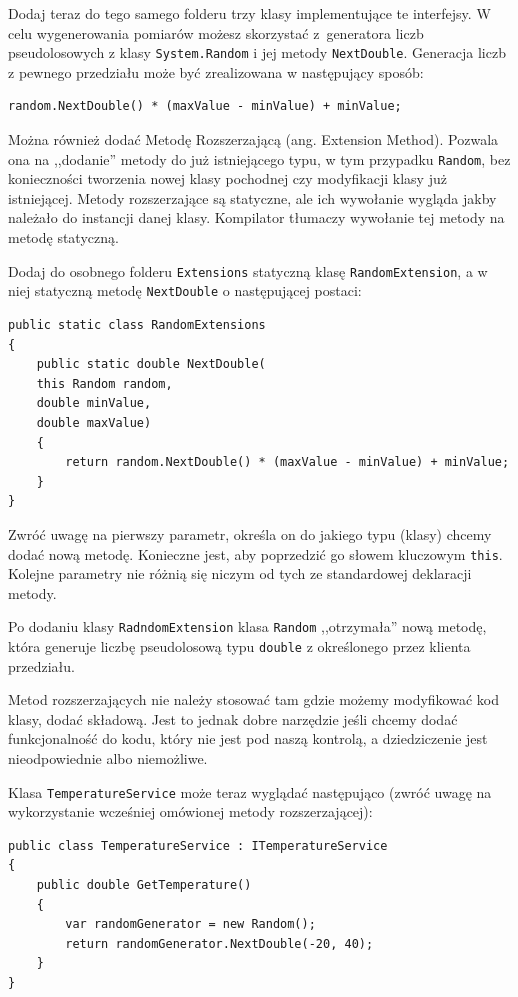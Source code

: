 Dodaj teraz do tego samego folderu trzy klasy implementujące te interfejsy. W celu wygenerowania pomiarów możesz skorzystać z~generatora liczb pseudolosowych z klasy \texttt{System.Random} i jej metody \texttt{NextDouble}. Generacja liczb z pewnego przedziału może być zrealizowana w następujący sposób:
\begin{lstlisting}	
random.NextDouble() * (maxValue - minValue) + minValue;
\end{lstlisting}
Można również dodać Metodę Rozszerzającą (ang. Extension Method). Pozwala ona na ,,dodanie'' metody do już istniejącego typu, w tym przypadku \texttt{Random}, bez konieczności tworzenia nowej klasy pochodnej czy modyfikacji klasy już istniejącej. Metody rozszerzające są statyczne, ale ich wywołanie wygląda jakby należało do instancji danej klasy. Kompilator tłumaczy wywołanie tej metody na metodę statyczną. 

Dodaj do osobnego folderu \texttt{Extensions} statyczną klasę \texttt{RandomExtension}, a w niej statyczną metodę \texttt{NextDouble} o następującej postaci:
\begin{lstlisting}	
public static class RandomExtensions
{
	public static double NextDouble(
	this Random random,
	double minValue,
	double maxValue)
	{
		return random.NextDouble() * (maxValue - minValue) + minValue;
	}
}
\end{lstlisting}
Zwróć uwagę na pierwszy parametr, określa on do jakiego typu (klasy) chcemy dodać nową metodę. Konieczne jest, aby poprzedzić go słowem kluczowym \texttt{this}. Kolejne parametry nie różnią się niczym od tych ze standardowej deklaracji metody.

Po dodaniu klasy \texttt{RadndomExtension} klasa \texttt{Random} ,,otrzymała'' nową metodę, która generuje liczbę pseudolosową typu \texttt{double} z określonego przez klienta przedziału. 

Metod rozszerzających nie należy stosować tam gdzie możemy modyfikować kod klasy, dodać składową. Jest to jednak dobre narzędzie jeśli chcemy dodać funkcjonalność do kodu, który nie jest pod naszą kontrolą, a dziedziczenie jest nieodpowiednie albo niemożliwe. 

Klasa \texttt{TemperatureService} może teraz wyglądać następująco (zwróć uwagę na wykorzystanie wcześniej omówionej metody rozszerzającej):
\begin{lstlisting}	
public class TemperatureService : ITemperatureService
{
	public double GetTemperature()
	{
		var randomGenerator = new Random();
		return randomGenerator.NextDouble(-20, 40);
	}
}
\end{lstlisting}

